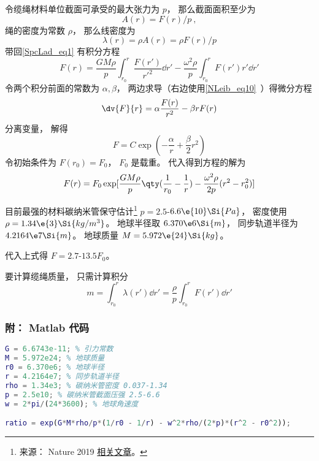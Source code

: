 令缆绳材料单位截面可承受的最大张力为 $p$， 那么截面面积至少为
\begin{equation}
A(r) = F(r)/p~,
\end{equation}
绳的密度为常数 $\rho$， 那么线密度为
\begin{equation}
\lambda(r) = \rho A(r) = \rho F(r)/p
\end{equation}
带回\autoref{SpcLad_eq1} 有积分方程
\begin{equation}
F(r) = \frac{GM\rho}{p} \int_{r_0}^{r} \frac{F(r')}{r'^2} \dd{r'} - \frac{\omega^2\rho}{p}\int_{r_0}^r F(r') r' \dd{r'}
\end{equation}
令两个积分前面的常数为 $\alpha, \beta$， 两边求导（右边使用\autoref{NLeib_eq10}~）得微分方程
\begin{equation}
\dv{F}{r} = \alpha \frac{F(r)}{r^2} - \beta r F(r)
\end{equation}
分离变量， 解得
\begin{equation}
F = C\exp(-\frac{\alpha}{r} + \frac{\beta}{2} r^2)
\end{equation}
令初始条件为 $F(r_0) = F_0$， $F_0$ 是载重。 代入得到方程的解为
\begin{equation}
F(r) = F_0 \exp[\frac{GM\rho}{p} \qty(\frac{1}{r_0} - \frac{1}{r}) - \frac{\omega^2\rho}{2p}(r^2 - r_0^2)]
\end{equation}

目前最强的材料碳纳米管保守估计\footnote{来源： Nature 2019 \href{https://www.nature.com/articles/s41467-019-10959-7}{相关文章}。} $p = 2.5$-$6.6\e{10} \Si{Pa}$， 密度使用 $\rho = 1.34\e{3} \Si{kg/m^3}$。 地球半径取 $6.370\e6\Si{m}$， 同步轨道半径为 $4.2164\e7 \Si{m}$。 地球质量 $M = 5.972\e{24} \Si{kg}$。

代入上式得 $F = 2.7$-$13.5 F_0$。

要计算缆绳质量， 只需计算积分
\begin{equation}
m = \int_{r_0}^{r} \lambda(r') \dd{r'} = \frac{\rho}{p} \int_{r_0}^{r} F(r') \dd{r'}
\end{equation}

\subsubsection{附： Matlab 代码}
\begin{lstlisting}[language=matlab]
G = 6.6743e-11; % 引力常数
M = 5.972e24; % 地球质量
r0 = 6.370e6; % 地球半径
r = 4.2164e7; % 同步轨道半径
rho = 1.34e3; % 碳纳米管密度 0.037-1.34
p = 2.5e10; % 碳纳米管截面压强 2.5-6.6
w = 2*pi/(24*3600); % 地球角速度

ratio = exp(G*M*rho/p*(1/r0 - 1/r) - w^2*rho/(2*p)*(r^2 - r0^2));
\end{lstlisting}

